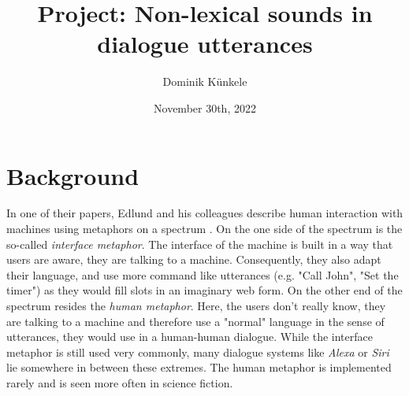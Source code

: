 \documentclass[
	11pt, %
]{fphw}
\title{Project: Non-lexical sounds in dialogue utterances} %
\date{November 30th, 2022} %
\author{Dominik Künkele}
\institute{University of Gothenburg} %
\begin{document}
\maketitle %


\section*{Background}
In one of their papers, Edlund and his colleagues describe human interaction with machines using metaphors on a spectrum \cite{edlund}. On the one side of the spectrum is the so-called \emph{interface metaphor}. The interface of the machine is built in a way that users are aware, they are talking to a machine. Consequently, they also adapt their language, and use more command like utterances (e.g. "Call John", "Set the timer") as they would fill slots in an imaginary web form. On the other end of the spectrum resides the \emph{human metaphor}. Here, the users don't really know, they are talking to a machine and therefore use a "normal" language in the sense of utterances, they would use in a human-human dialogue. While the interface metaphor is still used very commonly, many dialogue systems like \emph{Alexa} or \emph{Siri} lie somewhere in between these extremes. The human metaphor is implemented rarely and is seen more often in science fiction.
\end{document}
